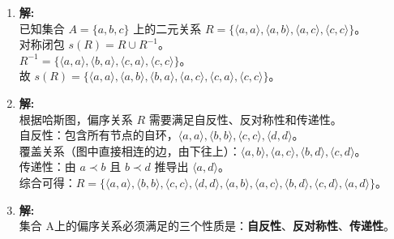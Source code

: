 \begin{enumerate}
	\vspace{1em}
	
	\item \textbf{解:}\\
	已知集合 $A = \{a, b, c\}$ 上的二元关系 $R = \{\langle a, a \rangle, \langle a, b \rangle, \langle a, c \rangle, \langle c, c \rangle\}$。\\
	对称闭包 $s(R) = R \cup R^{-1}$。\\
	$R^{-1} = \{\langle a, a \rangle, \langle b, a \rangle, \langle c, a \rangle, \langle c, c \rangle\}$。\\
	故 $s(R) = \{\langle a, a \rangle, \langle a, b \rangle, \langle b, a \rangle, \langle a, c \rangle, \langle c, a \rangle, \langle c, c \rangle\}$。
	
	\vspace{1em}
	
	\item \textbf{解:}\\
	根据哈斯图，偏序关系 $R$ 需要满足自反性、反对称性和传递性。\\
	自反性：包含所有节点的自环，$\langle a, a \rangle, \langle b, b \rangle, \langle c, c \rangle, \langle d, d \rangle$。\\
	覆盖关系（图中直接相连的边，由下往上）：$\langle a, b \rangle, \langle a, c \rangle, \langle b, d \rangle, \langle c, d \rangle$。\\
	传递性：由 $a \prec b$ 且 $b \prec d$ 推导出 $\langle a, d \rangle$。\\
	综合可得：$R = \{\langle a, a \rangle, \langle b, b \rangle, \langle c, c \rangle, \langle d, d \rangle, \langle a, b \rangle, \langle a, c \rangle, \langle b, d \rangle, \langle c, d \rangle, \langle a, d \rangle\}$。
	
	\vspace{1em}
	
	\item \textbf{解:}\\
	集合 A上的偏序关系必须满足的三个性质是：\textbf{自反性}、\textbf{反对称性}、\textbf{传递性}。
	
	\vspace{1em}
	

\end{enumerate}
